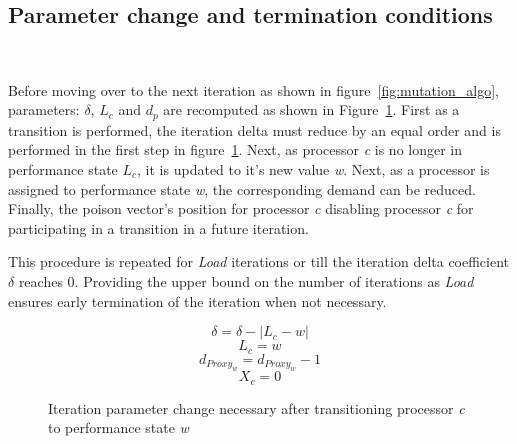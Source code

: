 \subsection{Parameter change and termination conditions}~\label{sec:param_adjust}

Before moving over to the next iteration as shown in figure~\ref{fig:mutation_algo},
parameters: $\delta$, $L_c$ and $d_p$ are recomputed
as shown in Figure~\ref{fig:adjust}. First as a transition is performed, the iteration delta
must reduce by an equal order and is performed in the first step in figure~\ref{fig:adjust}.
Next, as processor \textit{c} is no longer in performance state $L_c$, it is updated to
it's new value \textit{w}. Next, as a processor is assigned to performance state \textit{w},
the corresponding demand can be reduced. Finally, the poison vector's position for processor
\textit{c} disabling processor \textit{c} for participating in a transition in a future 
iteration.

This procedure is repeated for \textit{Load} iterations or till the iteration delta coefficient 
$\delta$ reaches 0. Providing the upper bound on the number of iterations as \textit{Load} 
ensures early termination of the iteration when not necessary. 


\begin{figure}[h!]
\centering
\begin{equation*}
    \delta = \delta - |L_{c} - w| 
\end{equation*}
\begin{equation*}
    L_{c} = w 
\end{equation*}
\begin{equation*}
    d_{Proxy_w} = d_{Proxy_w} - 1 
\end{equation*}
\begin{equation*}
    X_c = 0
\end{equation*}
\caption{Iteration parameter change necessary after transitioning processor \textit{c} to performance state \textit{w}}
\label{fig:adjust}
\end{figure}
